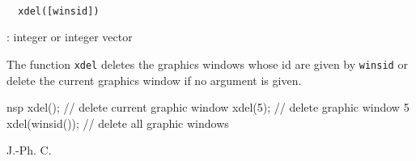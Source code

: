 \begin{mandesc}
  \\ 
\end{mandesc}
\begin{calling_sequence}
\begin{verbatim}
  xdel([winsid])   
\end{verbatim}
\end{calling_sequence}
\begin{parameters}
  \begin{varlist}
    : integer or integer vector\end{varlist}
\end{parameters}
\begin{mandescription}
  The function \verb!xdel! deletes the graphics windows whose id are given by 
  \verb!winsid! or delete the current graphics window if no argument is given.
\end{mandescription}
\begin{examples}
  \begin{mintednsp}{nsp}
    xdel(); // delete current graphic window
    xdel(5); // delete graphic window 5
    xdel(winsid()); // delete all graphic windows
  \end{mintednsp}
\end{examples}
\begin{manseealso}
\end{manseealso}
\begin{authors}
  J.-Ph. C.  
\end{authors}

